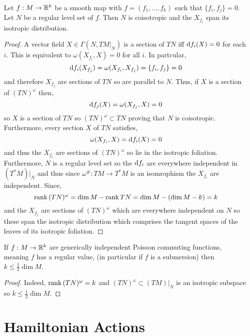 \documentclass[12pt]{extarticle}
\begin{document}
\begin{prop}
Let $f : M \to \mathbb{R}^k$ be a smooth map with $f = (f_1, \dots, f_k)$ such that $\{ f_i, f_j \} = 0$. Let $N$ be a regular level set of $f$. Then $N$ is coisotropic and the $X_{f_i}$ span its isotropic distribution. 
\end{prop}

\begin{proof}
A vector field $X \in \Gamma(N, TM|_N)$ is a section of $TN$ iff $\mathrm{d}{f_i}(X) = 0$ for each $i$. This is equivalent to $\omega(X_{f_i}, X) = 0$ for all $i$. In partcular,
\[ \mathrm{d}{f_i}(X_{f_j}) = \omega(X_{f_i}, X_{f_j}) = \{ f_i, f_j \} = 0 \]
and therefore $X_{f_j}$ are sections of $T N$ so are parallel to $N$. Thus, if $X$ is a section of $(T N)^\omega$ then,
\[ \mathrm{d}{f_j}(X) = \omega(X_{f_j}, X) = 0 \]
so $X$ is a section of $T N$ so $(T N)^\omega \subset TN$ proving that $N$ is coisotropic. Furthermore, every section $X$ of $T N$ satisfies,
\[ \omega(X_{f_i}, X) = \mathrm{d}{f_i}(X) = 0 \]
and thus the $X_{f_i}$ are sections of $(T N)^\omega$ so lie in the isotropic foliation. Furthermore, $N$ is a regular level set so the $\mathrm{d}{f_i}$ are everywhere independent in $(T^* M)|_N$ and thus since $\omega^\# : T M \to T^* M$ is an isomrophism the $X_{f_i}$ are independent. Since,
\[ \operatorname{\mathrm{rank}}{(T N)^\omega} = \dim{M} - \operatorname{\mathrm{rank}}{T N} = \dim{M} - (\dim{M} - k) = k \]
and the $X_{f_j}$ are sections of $(T N)^\omega$ which are everywhere independent on $N$ so these span the isotropic distribution which comprises the tangent spaces of the leaves of its isotropic foliation. 
\end{proof}

\begin{cor}
If $f : M \to \mathbb{R}^k$ are generically independent Poisson commuting functions, meaning $f$ has a regular value, (in particular if $f$ is a submersion) then $k \le \tfrac{1}{2} \dim{M}$.
\end{cor}

\begin{proof}
Indeed, $\operatorname{\mathrm{rank}}{ (T N)^\omega } = k$ and $(T N)^\omega \subset (T M)|_N$ is an isotropic subspace so $k \le \tfrac{1}{2} \dim{M}$. 
\end{proof}

\section{Hamiltonian Actions}

\newcommand{\g}{\mathfrak{g}}
\newcommand{\inner}[2]{\left< #1 , #2 \right>}
\end{document}
